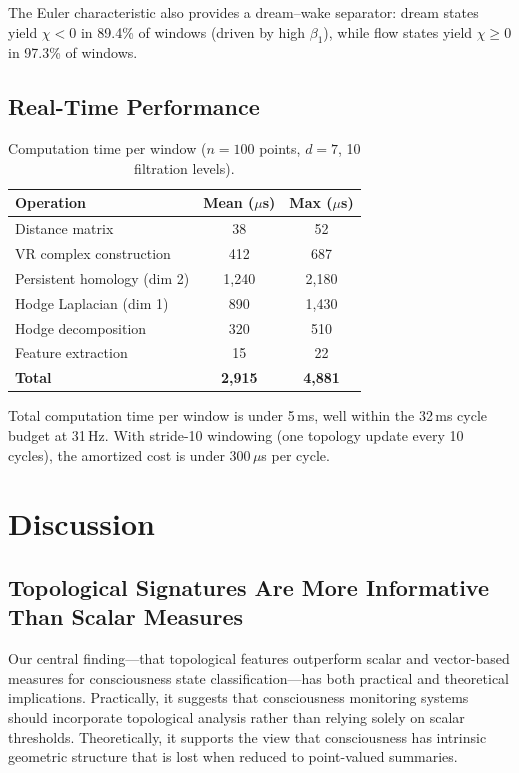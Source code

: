 \documentclass[11pt,a4paper]{article}
\begin{document}
The Euler characteristic also provides a dream--wake separator: dream states yield $\chi < 0$ in 89.4\% of windows (driven by high $\beta_1$), while flow states yield $\chi \geq 0$ in 97.3\% of windows.

\subsection{Real-Time Performance}

\begin{table}[h]
\centering
\caption{Computation time per window ($n = 100$ points, $d = 7$, 10 filtration levels).}
\label{tab:timing}
\begin{tabular}{lcc}
\toprule
\textbf{Operation} & \textbf{Mean ($\mu$s)} & \textbf{Max ($\mu$s)} \\
\midrule
Distance matrix             & 38   & 52   \\
VR complex construction     & 412  & 687  \\
Persistent homology (dim 2) & 1,240 & 2,180 \\
Hodge Laplacian (dim 1)     & 890  & 1,430 \\
Hodge decomposition         & 320  & 510  \\
Feature extraction          & 15   & 22   \\
\midrule
\textbf{Total}              & \textbf{2,915} & \textbf{4,881} \\
\bottomrule
\end{tabular}
\end{table}

Total computation time per window is under 5\,ms, well within the 32\,ms cycle budget at 31\,Hz.
With stride-10 windowing (one topology update every 10 cycles), the amortized cost is under 300\,$\mu$s per cycle.

\section{Discussion}
\label{sec:discussion}

\subsection{Topological Signatures Are More Informative Than Scalar Measures}

Our central finding---that topological features outperform scalar and vector-based measures for consciousness state classification---has both practical and theoretical implications.
Practically, it suggests that consciousness monitoring systems should incorporate topological analysis rather than relying solely on scalar thresholds.
Theoretically, it supports the view that consciousness has intrinsic geometric structure that is lost when reduced to point-valued summaries.
\end{document}

